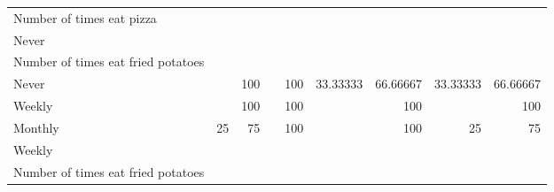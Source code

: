\documentclass{article}
\begin{document}
\begin{tabular}{lllllllll}
\multicolumn{1}{l}{\hspace{4em}Number of times eat pizza} &
  \multicolumn{1}{|r}{} &
  \multicolumn{1}{r}{} &
  \multicolumn{1}{r}{} &
  \multicolumn{1}{r}{} &
  \multicolumn{1}{r}{} &
  \multicolumn{1}{r}{} &
  \multicolumn{1}{r}{} &
  \multicolumn{1}{r}{} \\
\multicolumn{1}{l}{\hspace{5em}Never} &
  \multicolumn{1}{|r}{} &
  \multicolumn{1}{r}{} &
  \multicolumn{1}{r}{} &
  \multicolumn{1}{r}{} &
  \multicolumn{1}{r}{} &
  \multicolumn{1}{r}{} &
  \multicolumn{1}{r}{} &
  \multicolumn{1}{r}{} \\
\multicolumn{1}{l}{\hspace{6em}Number of times eat fried potatoes} &
  \multicolumn{1}{|r}{} &
  \multicolumn{1}{r}{} &
  \multicolumn{1}{r}{} &
  \multicolumn{1}{r}{} &
  \multicolumn{1}{r}{} &
  \multicolumn{1}{r}{} &
  \multicolumn{1}{r}{} &
  \multicolumn{1}{r}{} \\
\multicolumn{1}{l}{\hspace{7em}Never} &
  \multicolumn{1}{|r}{} &
  \multicolumn{1}{r}{100} &
  \multicolumn{1}{r}{} &
  \multicolumn{1}{r}{100} &
  \multicolumn{1}{r}{33.33333} &
  \multicolumn{1}{r}{66.66667} &
  \multicolumn{1}{r}{33.33333} &
  \multicolumn{1}{r}{66.66667} \\
\multicolumn{1}{l}{\hspace{7em}Weekly} &
  \multicolumn{1}{|r}{} &
  \multicolumn{1}{r}{100} &
  \multicolumn{1}{r}{} &
  \multicolumn{1}{r}{100} &
  \multicolumn{1}{r}{} &
  \multicolumn{1}{r}{100} &
  \multicolumn{1}{r}{} &
  \multicolumn{1}{r}{100} \\
\multicolumn{1}{l}{\hspace{7em}Monthly} &
  \multicolumn{1}{|r}{25} &
  \multicolumn{1}{r}{75} &
  \multicolumn{1}{r}{} &
  \multicolumn{1}{r}{100} &
  \multicolumn{1}{r}{} &
  \multicolumn{1}{r}{100} &
  \multicolumn{1}{r}{25} &
  \multicolumn{1}{r}{75} \\
\multicolumn{1}{l}{\hspace{5em}Weekly} &
  \multicolumn{1}{|r}{} &
  \multicolumn{1}{r}{} &
  \multicolumn{1}{r}{} &
  \multicolumn{1}{r}{} &
  \multicolumn{1}{r}{} &
  \multicolumn{1}{r}{} &
  \multicolumn{1}{r}{} &
  \multicolumn{1}{r}{} \\
\multicolumn{1}{l}{\hspace{6em}Number of times eat fried potatoes} &
  \multicolumn{1}{|r}{} &
  \multicolumn{1}{r}{} &
  \multicolumn{1}{r}{} &
  \multicolumn{1}{r}{} &
  \multicolumn{1}{r}{} &

\end{tabular}
\end{document}
